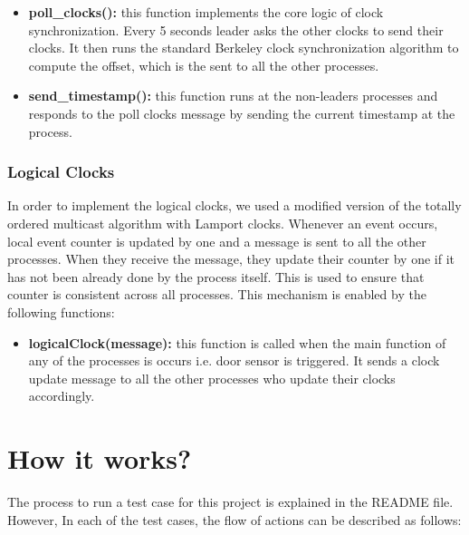 \documentclass[12pt]{article}
\begin{document}
\begin{itemize}
	\item \textbf{poll\_clocks():} this function implements the core logic of clock synchronization. 
	Every 5 seconds leader asks the other clocks to send their clocks. It then runs the standard 
	Berkeley clock synchronization algorithm to compute the offset, which is the sent to all the 
	other processes. 
	
	\item \textbf{send\_timestamp():} this function runs at the non-leaders processes and responds to the poll clocks message by sending the current timestamp at the process. 
\end{itemize}


\subsubsection{Logical Clocks}
In order to implement the logical clocks, we used a modified version of the totally ordered 
multicast algorithm with Lamport clocks. Whenever an event occurs, local event counter is
updated by one and a message is sent to all the other processes. When they receive the 
message, they update their counter by one if it has not been already done by the 
process itself. This is used to ensure that counter is consistent across all processes. This mechanism is enabled by the following functions:

\begin{itemize}
	\item \textbf{logicalClock(message):} this function is called when the main function of 
	any of the processes is occurs i.e. door sensor is triggered. It sends a clock update message
	to all the other processes who update their clocks accordingly. 
\end{itemize}


\section{How it works?}
The process to run a test case for this project is explained in the README file. However, In each of the test cases, the flow of actions can be described as follows:
\end{document}
